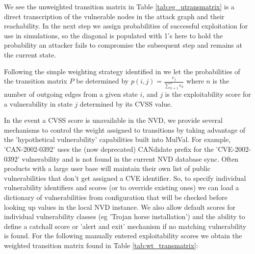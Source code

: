 \begin{table}[ht]
\tiny\centering
\caption{Weighted Transition Matrix}
\label{tab:eg_wtransmatrix}
{}
\label{tab:wt_transmatrix}
\label{fig:eg_tmatrix}
\end{table}


We see the unweighted transition matrix in Table \ref{tab:eg_utransmatrix} is a direct transcription of the vulnerable nodes in the attack graph and their reachability. In the next step we assign probabilities of successful exploitation for use in simulations, so the diagonal is populated with 1's here to hold the probability an attacker fails to compromise the subsequent step and remains at the current state.

Following the simple weighting strategy identified in \cite{Abraham_2016} we let the probabilities of the transition matrix $P$ be determined by $p(i,j)= \frac{e_j}{\sum_{k=1}^{n}e_k}$ where $n$ is the number of outgoing edges from a given state $i$, and $j$ is the exploitability score for a vulnerability in state $j$ determined by its CVSS value. 

In the event a CVSS score is unavailable in the NVD, we provide several mechanisms to control the weight assigned to transitions by taking advantage of the 'hypothetical vulnerability' capabilities built into MulVal. For example, 'CAN-2002-0392' uses the (now deprecated) CANdidate prefix for the 'CVE-2002-0392' vulnerability and is not found in the current NVD database sync. Often products with a large user base will maintain their own list of public vulnerabilities that don't get assigned a CVE identifier. So, to specify individual vulnerability identifiers and scores (or to override existing ones) we can load a dictionary of vulnerabilities from configuration that will be checked before looking up values in the local NVD instance. We also allow default scores for individual vulnerability classes (eg 'Trojan horse installation') and the ability to define a catchall score or 'alert and exit' mechanism if no matching vulnerability is found. For the following manually entered exploitability scores we obtain the weighted transition matrix found in Table \ref{tab:wt_transmatrix}:


